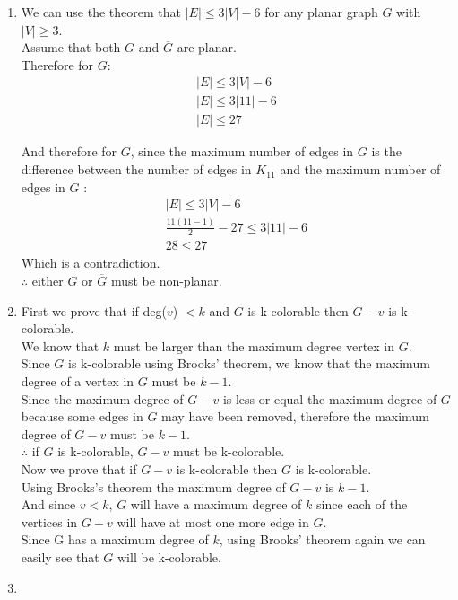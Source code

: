 \documentclass[11pt]{article}
\begin{document}
\begin{enumerate}[]
    \item
		We can use the theorem that $|E| \leq 3|V|-6$ for any planar graph $G$ with $|V| \geq 3$.\\
		Assume that both $G$ and $\overline{G}$ are planar.\\
		Therefore for $G$:
		\begin{gather}
		|E| \leq 3|V|-6 \nonumber \\
		|E| \leq 3|11|-6 \nonumber \\
		|E| \leq 27 \nonumber
		\end{gather}
		
		And therefore for $\overline{G}$, since the maximum number of edges in $\overline{G}$ is the difference between the number of edges in $K_11$ and the maximum number of edges in $G$ :
		\begin{gather}
		|E| \leq 3|V|-6 \nonumber \\
		\frac{11(11-1)}{2} -27 \leq 3|11|-6 \nonumber \\
		28 \leq 27 \nonumber
		\end{gather}
		Which is a contradiction.\\
		$\therefore$ either $G$ or $\overline{G}$ must be non-planar.
    \item
    	First we prove that if deg($v$) $< k$ and $G$ is k-colorable then $G-v$ is k-colorable.\\
    	We know that $k$ must be larger than the maximum degree vertex in $G$.\\
		Since $G$ is k-colorable using Brooks' theorem, we know that the maximum degree of a vertex in $G$ must be $k-1$.\\
		Since the maximum degree of $G-v$ is less or equal the maximum degree of $G$ because some edges in $G$ may have been removed, therefore the maximum degree of $G-v$ must be $k-1$.\\
		$\therefore$ if $G$ is k-colorable, $G-v$ must be k-colorable.\\
    	Now we prove that if $G-v$ is k-colorable then $G$ is k-colorable.\\    	
    	Using Brooks's theorem the maximum degree of $G-v$ is $k-1$.\\
    	And since $v<k$, $G$ will have a maximum degree of $k$ since each of the vertices in $G-v$ will have at most one more edge in $G$.\\
		Since G has a maximum degree of $k$, using Brooks' theorem again we can easily see that $G$ will be k-colorable.\\    	 
    \item

\end{enumerate}
\end{document}

